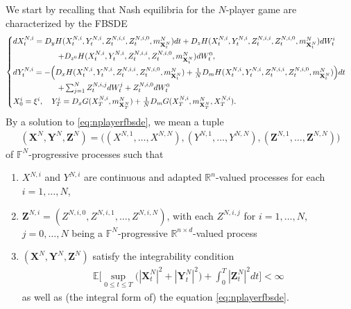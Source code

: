 \documentclass[11pt,reqno]{amsart}
\numberwithin{equation}{section}
\theoremstyle{definition}
\def\E{{\mathbb E}}
\def\R{{\mathbb R}}
\newcommand{\bX}{\mathbf{X}}
\newcommand{\bY}{\mathbf{Y}}
\newcommand{\bZ}{\mathbf{Z}}
\newcommand{\bbF}{\mathbb{F}}
\def \E{\mathbb{E}}
\def \R{\mathbb{R}}
\begin{document}
We start by recalling that
Nash equilibria for the $N$-player game are characterized by the FBSDE
\begin{align} \label{eq:nplayerfbsde}
  \begin{cases} \vspace{.1cm}
    dX_t^{N,i} = D_y H(X_t^{N,i}, Y_t^{N,i}, Z_t^{N,i,i}, Z_t^{N,i,0}, m_{\bX_t^N}^N) dt + D_z H(X_t^{N,i}, Y_t^{N,i}, Z_t^{N,i,i}, Z_t^{N,i,0}, m_{\bX_t^N}^N) dW_t^i   \\ \vspace{.1cm}
  \hspace{2cm} + D_{z^0} H(X_t^{N,i}, Y_t^{N,i}, Z_t^{N,i,i}, Z_t^{N,i,0}, m_{\bX_t^N}^N) dW_t^0, \\ \vspace{.1cm}
dY_t^{N,i} = -  \Big(D_x H(X_t^{N,i}, Y_t^{N,i}, Z_t^{N,i,i}, Z_t^{N,i,0}, m_{\bX_t^N}^N) + \frac{1}{N} D_m H(X_t^{N,i}, Y_t^{N,i}, Z_t^{N,i,i}, Z_t^{N,i,0}, m_{\bX_t^N}^N) \Big)  dt  \\
\hspace{2cm} + \sum_{j = 1}^N Z_t^{N,i,j}  dW_t^j + Z_t^{N,i,0}  dW_t^0 \vspace{.1cm}  \\
X_0^i = \xi^i, \quad Y_T^i = D_x G(X_T^{N,i}, m_{\bX_T^N}^N) + \frac{1}{N} D_m G(X_T^{N,i}, m_{\bX_T^N}^N, X_T^{N,i}).
\end{cases} 
\end{align}
By a solution to \eqref{eq:nplayerfbsde}, we mean a tuple
\begin{align*}
(\bX^N, \bY^N, \bZ^N) = \big( (X^{N,1},\dots,X^{N,N}), (Y^{N,1},\dots,Y^{N,N}), (\bZ^{N,1},\dots,\bZ^{N,N})\big)
\end{align*} 
of $\bbF^N$-progressive processes such that 
\begin{enumerate}
\item $X^{N,i}$ and $Y^{N,i}$ are continuous and adapted $\R^n$-valued processes for each $i = 1,\dots,N$,
\item $\bZ^{N,i} = (Z^{N,i,0},Z^{N,i,1},\dots,Z^{N,i,N})$, with each $Z^{N,i,j}$ for $i = 1,\dots,N$, $j = 0,\dots,N$ being a $\bbF^N$-progressive $\R^{n \times d}$-valued process
\item $(\bX^N,\bY^N,\bZ^N)$ satisfy the integrability condition 
\begin{align} \label{intconditions2}
\E\bigg[\sup_{0 \leq t \leq T} \big( |\bX_t^N|^2 + |\bY_t^N|^2 \big) + \int_0^T |\bZ_t^N|^2 dt \bigg] < \infty
\end{align}
as well as (the integral form of) the equation \eqref{eq:nplayerfbsde}. 
\end{enumerate} 
\end{document}
